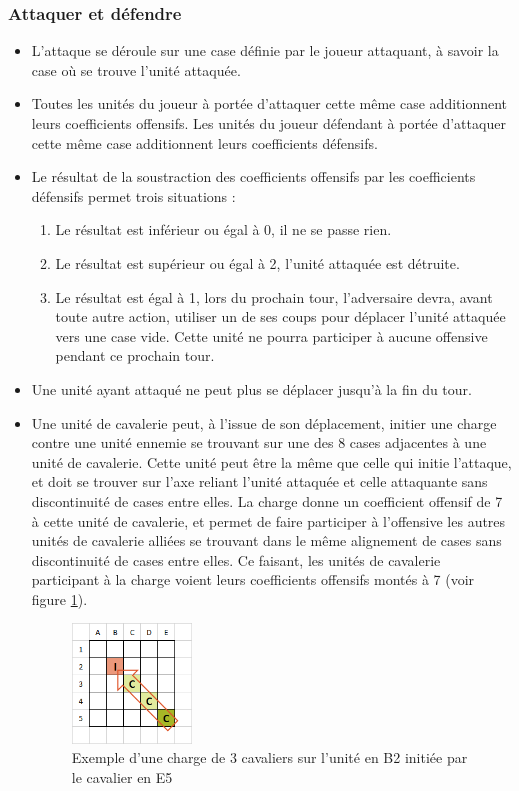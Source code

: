 \documentclass[a4paper]{report}
\begin{document}
\subsubsection*{Attaquer et défendre}
  \begin{itemize}
    \item L'attaque se déroule sur une case définie par le joueur attaquant, à savoir la case où se trouve l'unité attaquée.
    \item Toutes les unités du joueur à portée d'attaquer cette même case additionnent leurs coefficients offensifs. Les unités du joueur défendant à portée d'attaquer cette même case additionnent leurs coefficients défensifs.
    \item Le résultat de la soustraction des coefficients offensifs par les coefficients défensifs permet trois situations :
    	\begin{enumerate}
          \item Le résultat est inférieur ou égal à 0, il ne se passe rien.
          \item Le résultat est supérieur ou égal à 2, l'unité attaquée est détruite.
          \item Le résultat est égal à 1, lors du prochain tour, l'adversaire devra, avant toute autre action, utiliser un de ses coups pour déplacer l'unité attaquée vers une case vide. Cette unité ne pourra participer à aucune offensive pendant ce prochain tour.
    	\end{enumerate}
        \item Une unité ayant attaqué ne peut plus se déplacer jusqu'à la fin du tour.
        \item Une unité de cavalerie peut, à l'issue de son déplacement, initier une charge contre une unité ennemie se trouvant sur une des 8 cases adjacentes à une unité de cavalerie. Cette unité peut être la même que celle qui initie l'attaque, et doit se trouver sur l'axe reliant l'unité attaquée et celle attaquante sans discontinuité de cases entre elles. La charge donne un coefficient offensif de 7 à cette unité de cavalerie, et permet de faire participer à l'offensive les autres unités de cavalerie alliées se trouvant dans le même alignement de cases sans discontinuité de cases entre elles. Ce faisant, les unités de cavalerie participant à la charge voient leurs coefficients offensifs montés à 7 (voir figure \ref{fig:help_charge}). 
        
\begin{figure}[H]
\centering
\includegraphics[width=0.30\textwidth]{help/charge}
\caption{Exemple d'une charge de 3 cavaliers sur l'unité en B2 initiée par le cavalier en E5}\label{fig:help_charge}
\end{figure}
        

\end{itemize}
\end{document}
